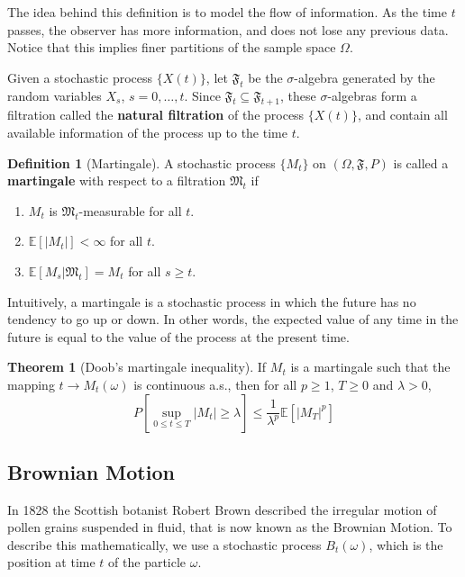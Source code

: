 \documentclass[12pt,a4paper]{article}
\theoremstyle{definition}
\newtheorem{theorem}{Theorem}[section]
\newtheorem{definition}{Definition}[section]
\begin{document}
The idea behind this definition is to model the flow of information. As the time $t$ passes, the observer has more information, and does not lose any previous data. Notice that this implies finer partitions of the sample space $\Omega$.

Given a stochastic process $\{ X(t) \}$, let $\mathfrak{F}_t$ be the $\sigma$-algebra generated by the random variables $X_s$, $s = 0, \ldots, t$. Since $\mathfrak{F}_t \subseteq \mathfrak{F}_{t+1}$, these $\sigma$-algebras form a filtration called the \textbf{natural filtration} of the process $\{ X(t) \}$, and contain all available information of the process up to the time $t$.

\begin{definition}[Martingale]
	A stochastic process $\{M_t \}$ on $(\Omega, \mathfrak{F}, P)$ is called a \textbf{martingale} with respect to a filtration $\mathfrak{M}_t$ if 
	\begin{enumerate}
		\item $M_t$ is $\mathfrak{M}_t$-measurable for all $t$.
		\item $\mathbb{E}[|M_t|] < \infty$ for all $t$.
		\item $\mathbb{E}[M_s | \mathfrak{M}_t] = M_t$ for all $s \geq t$.
	\end{enumerate}
\end{definition}

Intuitively, a martingale is a stochastic process in which the future has no tendency to go up or down. In other words, the expected value of any time in the future is equal to the value of the process at the present time.

\begin{theorem}[Doob's martingale inequality]
	If $M_t$ is a martingale such that the mapping $t \longrightarrow M_t(\omega)$ is continuous a.s., then for all $p \geq 1$, $T \geq 0$ and $\lambda > 0$,
	\[
		P \left[ \sup_{0 \leq t \leq T} |M_t| \geq \lambda \right] \leq \frac{1}{\lambda^p} \mathbb{E} [|M_T|^p]
	\]
\end{theorem}

\subsection{Brownian Motion}

In 1828 the Scottish botanist Robert Brown described the irregular motion of pollen grains suspended in fluid, that is now known as the Brownian Motion. To describe this mathematically, we use a stochastic process $B_t(\omega)$, which is the position at time $t$ of the particle $\omega$.
\end{document}
